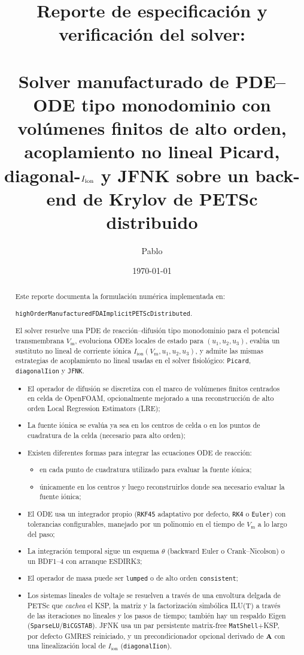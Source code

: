 \documentclass[11pt,a4paper]{article}
\title{Reporte de especificación y verificación del solver:\\
       \texorpdfstring{\code{highOrderManufacturedFDAImplicitPETScDistributed}}{highOrderManufacturedFDAImplicitPETScDistributed}\\
       \large Solver manufacturado de PDE--ODE tipo monodominio con volúmenes finitos de
       alto orden, acoplamiento no lineal Picard, diagonal-\texorpdfstring{$\Iion$}{Iion} y
       JFNK sobre un back-end de Krylov de PETSc distribuido}
\author{Pablo}
\date{\today}
\newcommand{\code}[1]{\texttt{\small #1}}
\newcommand{\Vm}{V_{\text{m}}}
\newcommand{\Iion}{I_{\mathrm{ion}}}
\newcommand{\Aimp}{\mathbf{A}}
\begin{document}
\maketitle

\begin{abstract}
Este reporte documenta la formulación numérica implementada en:

\begin{center}
\code{highOrderManufacturedFDAImplicitPETScDistributed}.
\end{center}

El solver resuelve una PDE de reacción--difusión tipo monodominio para el
potencial transmembrana $\Vm$, evoluciona ODEs locales de estado para $(u_1,u_2,u_3)$,
evalúa un sustituto no lineal de corriente iónica $\Iion(\Vm,u_1,u_2,u_3)$, y admite las
mismas estrategias de acoplamiento no lineal usadas en el solver fisiológico:
\code{Picard}, \code{diagonalIion} y \code{JFNK}. 


\begin{itemize}
	\item El operador de difusión se
	discretiza con el marco de volúmenes finitos centrados en celda de OpenFOAM,
	opcionalmente mejorado a una reconstrucción de alto orden Local
	Regression Estimators (LRE);
	\item La fuente iónica se evalúa ya sea en los centros de
	celda o en los puntos de cuadratura de la celda (necesario para alto orden);
	\item Existen diferentes formas para integrar las ecuaciones ODE de reacción:
	\begin{itemize}
		\item[(i)] en cada punto de cuadratura utilizado para evaluar la fuente iónica;
		\item[(ii)] únicamente en los centros y luego reconstruirlos donde sea necesario evaluar la fuente iónica;
	\end{itemize}
	\item El ODE usa un integrador propio (\code{RKF45} adaptativo por defecto,
	\code{RK4} o \code{Euler}) con tolerancias configurables, manejado por un
	polinomio en el tiempo de $\Vm$ a lo largo del paso;
	\item La integración temporal sigue un esquema $\theta$ (backward Euler o
	Crank--Nicolson) o un BDF1--4 con arranque ESDIRK3;
	\item El operador de masa puede ser \code{lumped} o de alto orden \code{consistent};
	\item Los sistemas lineales de voltaje se resuelven a través de una
	envoltura delgada de PETSc que \emph{cachea} el KSP, la matriz y la factorización simbólica
	ILU(T) a través de las iteraciones no lineales y los pasos de tiempo; también hay un
	respaldo Eigen (\code{SparseLU}/\code{BiCGSTAB}). JFNK usa un par persistente matrix-free
	\code{MatShell}+KSP, por defecto GMRES reiniciado, y un precondicionador opcional derivado
	de $\Aimp$ con una linealización local de $\Iion$ (\code{diagonalIion}).
\end{itemize}


\end{abstract}
\end{document}
